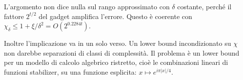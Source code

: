 \begin{remark}
L'argomento non dice nulla sul rango approssimato con $\delta$ costante, perché il fattore $2^{t/2}$ del gadget amplifica l'errore. Questo è coerente con $\chi_\delta\le 1+\xi/\delta^2=O(2^{0.2284t})$.

Inoltre l'implicazione va in un solo verso. Un lower bound incondizionato su $\chi$ non darebbe separazioni di classi di complessità. Il problema è un lower bound per un modello di calcolo algebrico ristretto, cioè le combinazioni lineari di funzioni stabilizer, su una funzione esplicita: $x\mapsto e^{i\pi|x|/4}$.
\end{remark}

